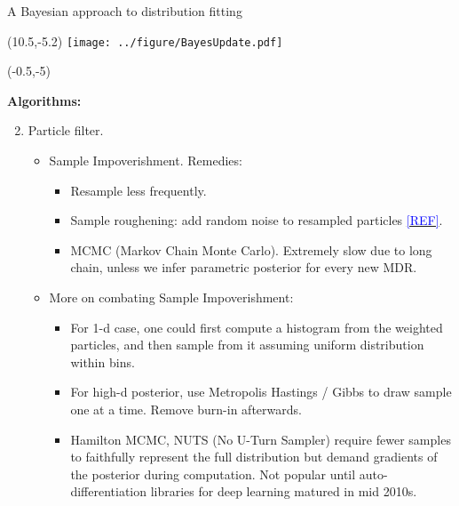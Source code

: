 \documentclass[aspectratio=169]{beamer}
\begin{document}
\begin{frame}{A Bayesian approach to distribution fitting}

\begin{textblock}{1}(10.5,-5.2)
\texttt{[image: ../figure/BayesUpdate.pdf]}
\end{textblock}

\begin{textblock}{10}(-0.5,-5)

\tiny\textbf{Algorithms:}\medskip

\begin{enumerate}\setcounter{enumi}{1}

\tiny\item Particle filter.\medskip

\begin{itemize}
\tiny\item Sample Impoverishment. Remedies:\medskip

\begin{itemize}
\tiny\item Resample less frequently.\medskip

\tiny\item Sample roughening: add random noise to resampled particles \href{https://www.hindawi.com/journals/mpe/2015/168045/}{\textcolor{blue}{[REF]}}.\medskip

\tiny\item MCMC (Markov Chain Monte Carlo). Extremely slow due to long chain, unless we infer parametric posterior for every new MDR.\medskip

\end{itemize}%

\tiny\item More on combating Sample Impoverishment:\medskip

\begin{itemize}

\tiny\item For 1-d case, one could first compute a histogram from the weighted particles, and then sample from it assuming uniform distribution within bins.\medskip

\tiny\item For high-d posterior, use Metropolis Hastings / Gibbs to draw sample one at a time. Remove burn-in afterwards.\medskip

\tiny\item Hamilton MCMC, NUTS (No U-Turn Sampler) require fewer samples to faithfully represent the full distribution but demand gradients of the posterior during computation. Not popular until auto-differentiation libraries for deep learning matured in mid 2010s.
\end{itemize}


\end{itemize}
\end{enumerate}
\end{textblock}
\end{frame}
\end{document}
